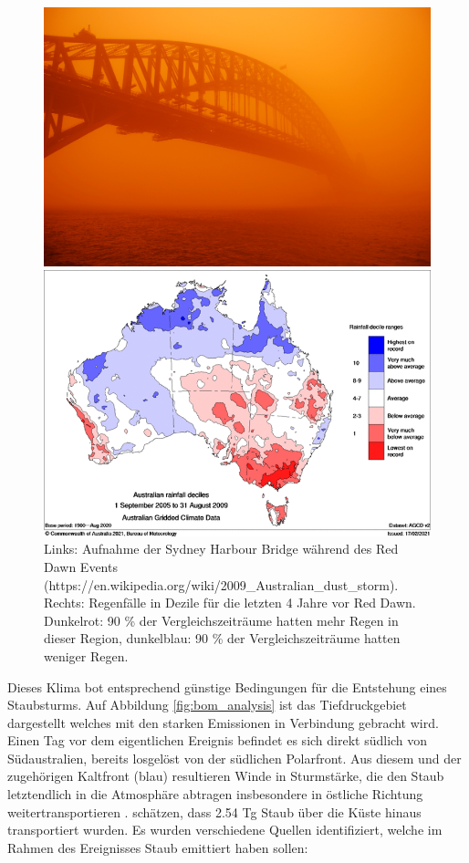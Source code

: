 \documentclass[12pt,a4paper,onecolumn,draft]{scrartcl}
\begin{document}
\begin{figure}[ht]
	\begin{minipage}[c]{0.5\textwidth}
		\includegraphics[width=\textwidth]{bilder/reddawn/SHB.jpg}
	\end{minipage}\hfill
	\begin{minipage}[c]{0.49\textwidth}
		\includegraphics[width=\textwidth]{bilder/reddawn/drought.png}
	\end{minipage}\hfill
	\caption{Links: Aufnahme der Sydney Harbour Bridge während des Red Dawn Events (https://en.wikipedia.org/wiki/2009_Australian_dust_storm). Rechts: Regenfälle in Dezile für die letzten 4 Jahre vor Red Dawn. Dunkelrot: 90 \% der Vergleichszeiträume hatten mehr Regen in dieser Region, dunkelblau: 90 \% der Vergleichszeiträume hatten weniger Regen.} \label{fig:reddawn}
\end{figure}
Dieses Klima bot entsprechend günstige Bedingungen für die Entstehung eines Staubsturms. Auf Abbildung \ref{fig:bom_analysis} ist das Tiefdruckgebiet dargestellt welches mit den starken Emissionen in Verbindung gebracht wird. Einen Tag vor dem eigentlichen Ereignis befindet es sich direkt südlich von Südaustralien, bereits losgelöst von der südlichen Polarfront. Aus diesem und der zugehörigen Kaltfront (blau) resultieren Winde in Sturmstärke, die den Staub letztendlich in die Atmosphäre abtragen insbesondere in östliche Richtung weitertransportieren \citep{Leys.2011}.\citet{Leys.2011} schätzen, dass 2.54 Tg Staub über die Küste hinaus transportiert wurden.  Es wurden verschiedene Quellen identifiziert, welche im Rahmen des Ereignisses Staub emittiert haben sollen:
\end{document}
